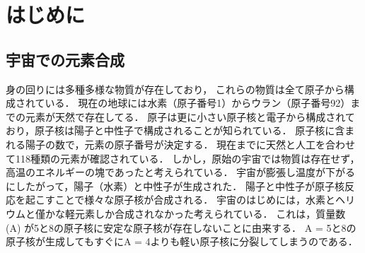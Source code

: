 \documentclass[../master]{subfiles}
\begin{document}
\chapter{はじめに}
\section{宇宙での元素合成}
\label{seq::nucleaosynthesis}
身の回りには多種多様な物質が存在しており，
これらの物質は全て原子から構成されている．
現在の地球には水素（原子番号1）からウラン（原子番号92）までの元素が天然で存在してる．
原子は更に小さい原子核と電子から構成されており，原子核は陽子と中性子で構成されることが知られている．
原子核に含まれる陽子の数で，元素の原子番号が決定する．
現在までに天然と人工を合わせて118種類の元素が確認されている．
しかし，原始の宇宙では物質は存在せず，高温のエネルギーの塊であったと考えられている．
宇宙が膨張し温度が下がるにしたがって，陽子（水素）と中性子が生成された．
陽子と中性子が原子核反応を起こすことで様々な原子核が合成される．
宇宙のはじめには，水素とヘリウムと僅かな軽元素しか合成されなかった考えられている．
これは，質量数 (A) が5と8の原子核に安定な原子核が存在しないことに由来する．
A = 5と8の原子核が生成してもすぐにA = 4よりも軽い原子核に分裂してしまうのである．
\end{document}
